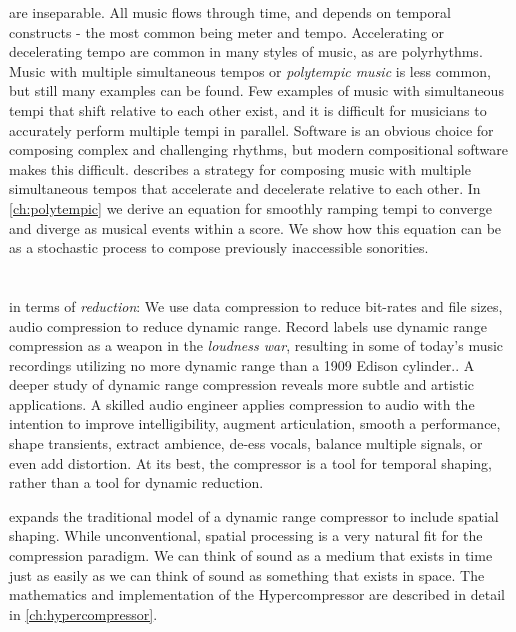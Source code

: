  are inseparable. All music flows through
time, and depends on temporal constructs - the most common being meter
and tempo. Accelerating or decelerating tempo are common in many
styles of music, as are polyrhythms.  Music with multiple simultaneous
tempos or \textit{polytempic music} is less common, but still many
examples can be found. Few examples of music with simultaneous tempi
that shift relative to each other exist, and it is difficult for
musicians to accurately perform multiple tempi in parallel. Software
is an obvious choice for composing complex and challenging rhythms,
but modern compositional software makes this difficult. \polytempic
describes a strategy for composing music with multiple simultaneous
tempos that accelerate and decelerate relative to each other. In
\autoref{ch:polytempic} we derive an equation for smoothly ramping
tempi to converge and diverge as musical events within a score. We
show how this equation can be as a stochastic process to compose
previously inaccessible sonorities. 

\section{\thesis}
\label{sec:hypercompression-intro}
 in terms of
\emph{reduction}: We use data compression to reduce bit-rates and file
sizes, audio compression to reduce dynamic range. Record labels use
dynamic range compression as a weapon in the \emph{loudness
  war}\cite{Deruty2014a}, resulting in some of today's music
recordings utilizing no more dynamic range than a 1909 Edison
cylinder.\cite{Katz2007}. A deeper study of dynamic range compression
reveals more subtle and artistic applications. A skilled audio
engineer applies compression to audio with the intention to improve
intelligibility, augment articulation, smooth a performance, shape
transients, extract ambience, de-ess vocals, balance multiple signals,
or even add distortion.\cite{Case2007} At its best, the compressor is
a tool for temporal shaping, rather than a tool for dynamic reduction.

\thesis expands the traditional model of a dynamic range compressor to
include spatial shaping. While unconventional, spatial
processing is a very natural fit for the compression paradigm. We can
think of sound as a medium that exists in time just as easily as we
can think of sound as something that exists in
space. The mathematics and implementation of the
Hypercompressor are described in detail in \autoref{ch:hypercompressor}.

